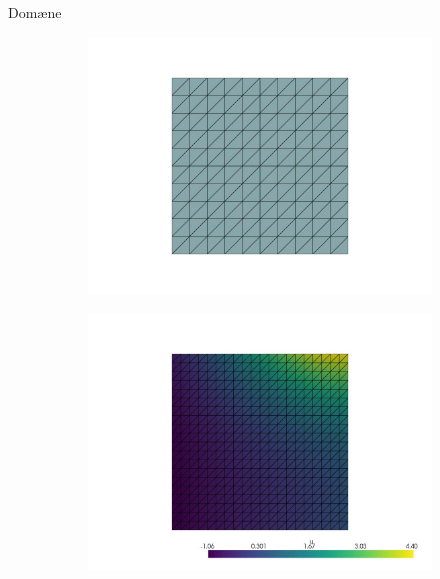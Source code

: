 \begin{frame}{Domæne}
\begin{figure}
    \centering
    \begin{subfigure}{.49\textwidth}
        \centering
        \includegraphics[width=\textwidth]{figurer/screenshot_1.jpeg}
      \end{subfigure}
    \begin{subfigure}{.49\textwidth}
        \centering
        \includegraphics[width=\textwidth]{figurer/screenshot_2.jpeg}
    \end{subfigure}
    \begin{subfigure}{.49\textwidth}
        \centering

\end{subfigure}
\end{figure}
\end{frame}
